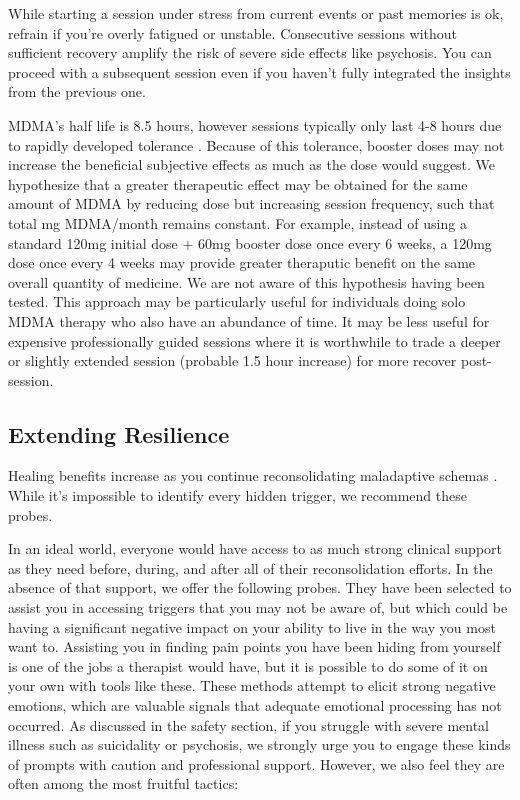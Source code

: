 \documentclass[12pt,letterpaper]{article}
\begin{document}
While starting a session under stress from current events or past memories is ok, refrain if you're overly fatigued or unstable.   Consecutive sessions without sufficient recovery amplify the risk of severe side effects like psychosis. You can proceed with a subsequent session even if you haven't fully integrated the insights from the previous one. 

MDMA's half life is 8.5 hours, however sessions typically only last 4-8 hours due to rapidly developed tolerance \cite{torrePharmacology,mithoeferManual,vizeliActuteEffects,farreTolerance}. Because of this tolerance, booster doses may not increase the beneficial subjective effects as much as the dose would suggest. We hypothesize that a greater therapeutic effect may be obtained for the same amount of MDMA by reducing dose but increasing session frequency, such that total mg MDMA/month remains constant. For example, instead of using a standard 120mg initial dose + 60mg booster dose once every 6 weeks, a 120mg dose once every 4 weeks may provide greater theraputic benefit on the same overall quantity of medicine. We are not aware of this hypothesis having been tested. This approach may be particularly useful for individuals doing solo MDMA therapy who also have an abundance of time. It may be less useful for expensive professionally guided sessions where it is worthwhile to trade a deeper or slightly extended session (probable 1.5 hour increase) for more recover post-session.
\subsection{Extending Resilience}
\label{completed}
Healing benefits increase as you continue reconsolidating maladaptive schemas \cite{rachmanProcessing}. While it's impossible to identify every hidden trigger, we recommend these probes.

In an ideal world, everyone would have access to as much strong clinical support as they need before, during, and after all of their reconsolidation efforts. In the absence of that support, we offer the following probes. They have been selected to assist you in accessing triggers that you may not be aware of, but which could be having a significant negative impact on your ability to live in the way you most want to. Assisting you in finding pain points you have been hiding from yourself is one of the jobs a therapist would have, but it is possible to do some of it on your own with tools like these. These methods attempt to elicit strong negative emotions, which are valuable signals that adequate emotional processing has not occurred. As discussed in the safety section, if you struggle with severe mental illness such as suicidality or psychosis, we strongly urge you to engage these kinds of prompts with caution and professional support. However, we also feel they are often among the most fruitful tactics:
\end{document}
